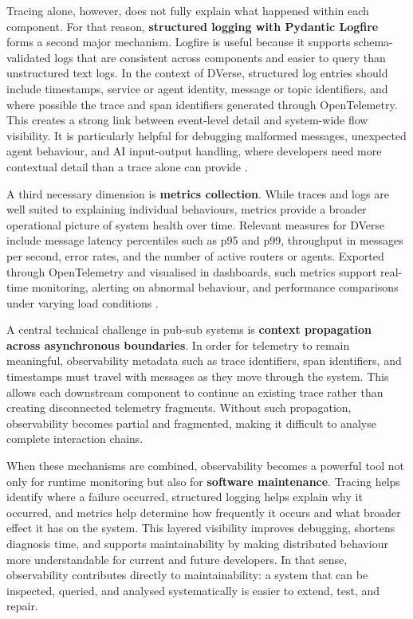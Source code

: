 \documentclass[11pt]{article}
\begin{document}
Tracing alone, however, does not fully explain what happened within each component. For that reason, \textbf{structured logging with Pydantic Logfire} forms a second major mechanism. Logfire is useful because it supports schema-validated logs that are consistent across components and easier to query than unstructured text logs. In the context of DVerse, structured log entries should include timestamps, service or agent identity, message or topic identifiers, and where possible the trace and span identifiers generated through OpenTelemetry. This creates a strong link between event-level detail and system-wide flow visibility. It is particularly helpful for debugging malformed messages, unexpected agent behaviour, and AI input-output handling, where developers need more contextual detail than a trace alone can provide \cite{logfireDocs,logfireConcepts}.

A third necessary dimension is \textbf{metrics collection}. While traces and logs are well suited to explaining individual behaviours, metrics provide a broader operational picture of system health over time. Relevant measures for DVerse include message latency percentiles such as p95 and p99, throughput in messages per second, error rates, and the number of active routers or agents. Exported through OpenTelemetry and visualised in dashboards, such metrics support real-time monitoring, alerting on abnormal behaviour, and performance comparisons under varying load conditions \cite{opentelemetryDocs,logfireConcepts}.

A central technical challenge in pub-sub systems is \textbf{context propagation across asynchronous boundaries}. In order for telemetry to remain meaningful, observability metadata such as trace identifiers, span identifiers, and timestamps must travel with messages as they move through the system. This allows each downstream component to continue an existing trace rather than creating disconnected telemetry fragments. Without such propagation, observability becomes partial and fragmented, making it difficult to analyse complete interaction chains.

When these mechanisms are combined, observability becomes a powerful tool not only for runtime monitoring but also for \textbf{software maintenance}. Tracing helps identify where a failure occurred, structured logging helps explain why it occurred, and metrics help determine how frequently it occurs and what broader effect it has on the system. This layered visibility improves debugging, shortens diagnosis time, and supports maintainability by making distributed behaviour more understandable for current and future developers. In that sense, observability contributes directly to maintainability: a system that can be inspected, queried, and analysed systematically is easier to extend, test, and repair.
\end{document}
